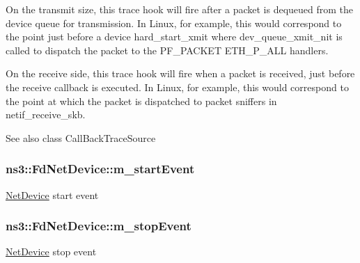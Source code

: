 On the transmit size, this trace hook will fire after a packet is dequeued from the device queue for transmission. In Linux, for example, this would correspond to the point just before a device hard\+\_\+start\+\_\+xmit where dev\+\_\+queue\+\_\+xmit\+\_\+nit is called to dispatch the packet to the P\+F\+\_\+\+P\+A\+C\+K\+ET E\+T\+H\+\_\+\+P\+\_\+\+A\+LL handlers.

On the receive side, this trace hook will fire when a packet is received, just before the receive callback is executed. In Linux, for example, this would correspond to the point at which the packet is dispatched to packet sniffers in netif\+\_\+receive\+\_\+skb.

\begin{DoxySeeAlso}{See also}
class Call\+Back\+Trace\+Source 
\end{DoxySeeAlso}
\subsubsection[{\texorpdfstring{m\+\_\+start\+Event}{m_startEvent}}]{ ns3\+::\+Fd\+Net\+Device\+::m\+\_\+start\+Event\hspace{0.3cm}{\ttfamily [private]}}\hypertarget{classns3_1_1FdNetDevice_a759e74ace56841b2ae47c69ff0276b2f}{}\label{classns3_1_1FdNetDevice_a759e74ace56841b2ae47c69ff0276b2f}
\hyperlink{classns3_1_1NetDevice}{Net\+Device} start event 
\subsubsection[{\texorpdfstring{m\+\_\+stop\+Event}{m_stopEvent}}]{ ns3\+::\+Fd\+Net\+Device\+::m\+\_\+stop\+Event\hspace{0.3cm}{\ttfamily [private]}}\hypertarget{classns3_1_1FdNetDevice_a010c8ac9ac2fffeb6ce1ffaf94b5a890}{}\label{classns3_1_1FdNetDevice_a010c8ac9ac2fffeb6ce1ffaf94b5a890}
\hyperlink{classns3_1_1NetDevice}{Net\+Device} stop event 
